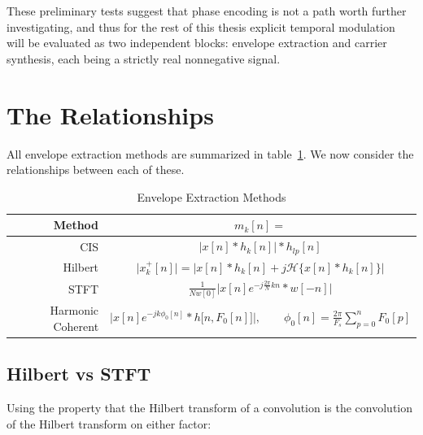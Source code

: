 \documentclass [11pt, proquest,oneside] {ganter_thesis}[2015/03/03]
\begin{document}

These preliminary tests suggest that phase encoding is not a path worth further investigating, and thus for the rest of this thesis explicit temporal modulation will be evaluated as two independent blocks: envelope extraction and carrier synthesis, each being a strictly real nonnegative signal.

\section{The Relationships}

All envelope extraction methods are summarized in table~\ref{table:envelope_extraction_methods}.  We now consider the relationships between each of these.

\begin{table}
\begin{center}
\bgroup
\def\arraystretch{1.7}
\begin{tabular}{| r | c |}
  \hline
  \textbf{Method} & $m_k[n] = $ \\ \hline
  CIS & $\Big| x[n] * h_k[n] \Big| * h_{lp}[n]$ \\ \hline
  Hilbert & $\Big| x^+_k[n] \Big| = \Big| x[n] * h_k[n] + j\mathcal{H}\{x[n] * h_k[n]\} \Big|$ \\ \hline
  STFT & $\frac{1}{Nw[0]}  \Big\vert x[n] e^{-j\frac{2\pi}{N}kn} * w[-n] \Big\vert$ \\ \hline
  Harmonic Coherent & $\Big| x[n] e^{-jk\phi_0 [n]} * h\big[n, F_0[n] \big] \Big|, \qquad \phi_0[n] = \frac{2\pi}{F_s} \sum_{p=0}^{n} F_0[p]$ \\ \hline
\end{tabular}
\egroup
\end{center}
\caption{Envelope Extraction Methods}\label{table:envelope_extraction_methods}
\end{table}

\subsection{Hilbert vs STFT}

Using the property that the Hilbert transform of a convolution is the convolution of the Hilbert transform on either factor:
\end{document}
